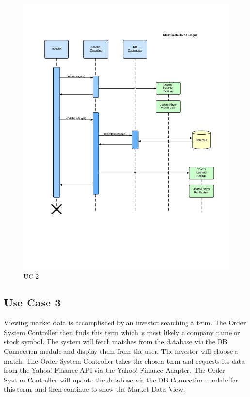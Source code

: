 \begin{figure}[H]
\centering
\includegraphics[width=5.5in]{./img/inter/uc2.jpg}
\caption{UC-2}
\end{figure}

\subsection{Use Case 3}
Viewing market data is accomplished by an investor searching a term. The Order
System Controller then finds this term which is most likely a company name or
stock symbol. The system will fetch matches from the database via the DB
Connection module and display them from the user. The investor will choose a
match. The Order System Controller takes the chosen term and requests its data
from the Yahoo! Finance API via the Yahoo! Finance Adapter. The Order System
Controller will update the database via the DB Connection module for this term,
and then continue to show the Market Data View.\\


